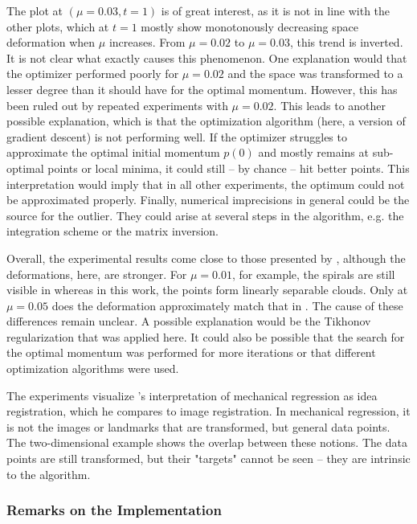 The plot at $(\mu=0.03, t=1)$ is of great interest, as it is not in line with the other plots, which at $t=1$ mostly show monotonously decreasing space deformation when $\mu$ increases.
From $\mu = 0.02$ to $\mu = 0.03$, this trend is inverted.
It is not clear what exactly causes this phenomenon.
One explanation would that the optimizer performed poorly for $\mu=0.02$ and the space was transformed to a lesser degree than it should have for the optimal momentum.
However, this has been ruled out by repeated experiments with $\mu = 0.02$.
This leads to another possible explanation, which is that the optimization algorithm (here, a version of gradient descent) is not performing well.
If the optimizer struggles to approximate the optimal initial momentum $p(0)$ and mostly remains at sub-optimal points or local minima, it could still -- by chance -- hit better points.
This interpretation would imply that in all other experiments, the optimum could not be approximated properly.
Finally, numerical imprecisions in general could be the source for the outlier.
They could arise at several steps in the algorithm, e.g. the integration scheme or the matrix inversion.

Overall, the experimental results come close to those presented by \citet{owhadi20}, although the deformations, here, are stronger.
For $\mu = 0.01$, for example, the spirals are still visible in \cite{owhadi20} whereas in this work, the points form linearly separable clouds.
Only at $\mu = 0.05$ does the deformation approximately match that in \cite{owhadi20}.
The cause of these differences remain unclear.
A possible explanation would be the Tikhonov regularization that was applied here.
It could also be possible that the search for the optimal momentum was performed for more iterations or that different optimization algorithms were used.

The experiments visualize \citet{owhadi20}'s interpretation of mechanical regression as idea registration, which he compares to image registration.
In mechanical regression, it is not the images or landmarks that are transformed, but general data points.
The two-dimensional example shows the overlap between these notions.
The data points are still transformed, but their "targets" cannot be seen -- they are intrinsic to the algorithm.

\subsubsection{Remarks on the Implementation}

